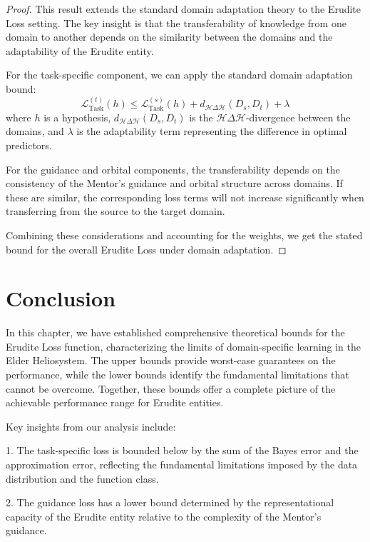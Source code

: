 \begin{proof}
This result extends the standard domain adaptation theory to the Erudite Loss setting. The key insight is that the transferability of knowledge from one domain to another depends on the similarity between the domains and the adaptability of the Erudite entity.

For the task-specific component, we can apply the standard domain adaptation bound:
\begin{equation}
\mathcal{L}_{\text{Task}}^{(t)}(h) \leq \mathcal{L}_{\text{Task}}^{(s)}(h) + d_{\mathcal{H}\Delta\mathcal{H}}(D_s, D_t) + \lambda
\end{equation}
where $h$ is a hypothesis, $d_{\mathcal{H}\Delta\mathcal{H}}(D_s, D_t)$ is the $\mathcal{H}\Delta\mathcal{H}$-divergence between the domains, and $\lambda$ is the adaptability term representing the difference in optimal predictors.

For the guidance and orbital components, the transferability depends on the consistency of the Mentor's guidance and orbital structure across domains. If these are similar, the corresponding loss terms will not increase significantly when transferring from the source to the target domain.

Combining these considerations and accounting for the weights, we get the stated bound for the overall Erudite Loss under domain adaptation.
\end{proof}

\section{Conclusion}

In this chapter, we have established comprehensive theoretical bounds for the Erudite Loss function, characterizing the limits of domain-specific learning in the Elder Heliosystem. The upper bounds provide worst-case guarantees on the performance, while the lower bounds identify the fundamental limitations that cannot be overcome. Together, these bounds offer a complete picture of the achievable performance range for Erudite entities.

Key insights from our analysis include:

1. The task-specific loss is bounded below by the sum of the Bayes error and the approximation error, reflecting the fundamental limitations imposed by the data distribution and the function class.

2. The guidance loss has a lower bound determined by the representational capacity of the Erudite entity relative to the complexity of the Mentor's guidance.

